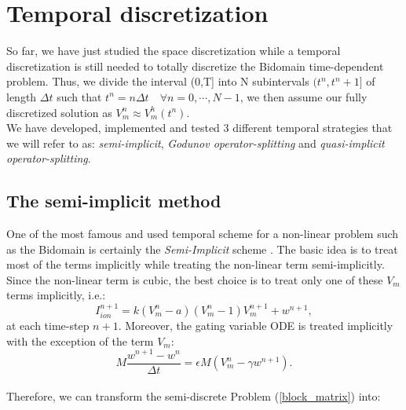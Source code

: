 \documentclass[a4paper,11pt]{article}
\begin{document}
\newpage 
\section{Temporal discretization}\label{temporal_discretization}
So far, we have just studied the space discretization while a temporal discretization is still needed to totally discretize the Bidomain time-dependent problem. Thus, we divide the interval (0,T] into N subintervals $(t^n,t^n+1]$ of length $\Delta t$ such that $t^n=n \Delta t \quad \forall n=0,\cdots,N-1$, we then assume our fully discretized solution as $V_m^n\approx V_m^h(t^n)$. \\
We have developed, implemented and tested 3 different temporal strategies that we will refer to as: \emph{semi-implicit}, \emph{Godunov operator-splitting} and \emph{quasi-implicit operator-splitting}. 
\subsection{The semi-implicit method}
One of the most famous and used temporal scheme for a non-linear problem such as the Bidomain is certainly the \emph{Semi-Implicit} scheme \cite{acta}. The basic idea is to treat most of the terms implicitly while treating the non-linear term semi-implicitly. Since the non-linear term is cubic, the best choice is to treat only one of these $V_m$ terms implicitly, i.e.:
\begin{equation*}
I_{ion}^{n+1}=k(V_m^n-a)(V_m^n-1)V_m^{n+1}+w^{n+1},
\end{equation*}
at each time-step $n+1$. 
Moreover, the gating variable ODE is treated implicitly with the exception of the term $V_m$:
\begin{equation*}
M \frac{w^{n+1}-w^n}{\Delta t}=\epsilon M (V_m^n-\gamma w^{n+1}).
\end{equation*}
\vspace{5mm} \\
Therefore, we can transform the semi-discrete Problem (\ref{block_matrix}) into:
\end{document}
